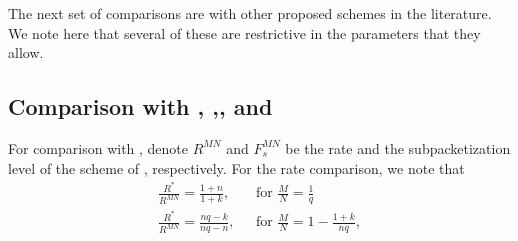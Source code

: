 \documentclass[journal,twocolumn]{IEEEtran}
\theoremstyle{definition}
\newcommand{\aditya}[1]{\marginpar{+}{\bf Aditya's remark}: {\em #1}}
\newcommand{\litang}[1]{\marginpar{+}{\bf Li's remark}: {\em #1}}
\begin{document}

The next set of comparisons are with other proposed schemes in the literature. We note here that several of these are restrictive in the parameters that they allow.
\subsection{Comparison with \cite{maddahN14}, \cite{yan_et_al17},\cite{yan2016placement}, \cite{shangguan2016centralized} and \cite{shanmugam2017coded}}

For comparison with \cite{maddahN14}, denote  $R^{MN}$  and $F_s^{MN}$ be the rate and the subpacketization level of the scheme of \cite{maddahN14}, respectively. For the rate comparison, we note that
\begin{align*}
 \frac{R^*}{R^{MN}}=\frac{1+n}{1+k},&\text{~~for~} \frac{M}{N}=\frac{1}{q}\\
\frac{R^*}{R^{MN}}=\frac{nq-k}{nq-n},&\text{~~for~} \frac{M}{N}=1-\frac{1+k}{nq},
\end{align*}
\end{document}
